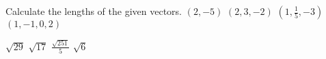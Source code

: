 
\begin{Exercise}[
name={},
title={}, 
difficulty=0,
origin={\cite{SM}}]
Calculate the lengths of the given vectors.
\Question $(2,-5)$
\Question $(2,3,-2)$
\Question $\left(1,\frac{1}{5},-3\right)$
\Question $(1,-1,0,2)$
\end{Exercise}

\begin{Answer}
\Question $\sqrt{29}$
\Question $\sqrt{17}$
\Question $\frac{\sqrt{251}}{5}$
\Question $\sqrt{6}$
\end{Answer}
